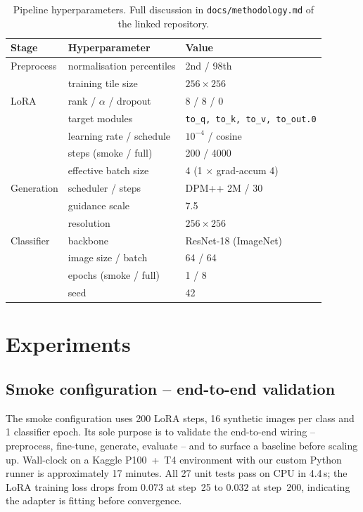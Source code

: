 \documentclass[12pt,a4paper]{article}
\begin{document}
\begin{table}[t]
\centering
\small
\begin{tabular}{lll}
\toprule
\textbf{Stage} & \textbf{Hyperparameter} & \textbf{Value} \\
\midrule
Preprocess     & normalisation percentiles      & 2nd / 98th \\
               & training tile size             & $256\times256$ \\
LoRA           & rank / $\alpha$ / dropout      & 8 / 8 / 0 \\
               & target modules                 & \texttt{to\_q,\ to\_k,\ to\_v,\ to\_out.0} \\
               & learning rate / schedule       & $10^{-4}$ / cosine \\
               & steps (smoke / full)           & 200 / 4000 \\
               & effective batch size           & 4 (1 $\times$ grad-accum 4) \\
Generation     & scheduler / steps              & DPM++ 2M / 30 \\
               & guidance scale                 & 7.5 \\
               & resolution                     & $256\times256$ \\
Classifier     & backbone                       & ResNet-18 (ImageNet) \\
               & image size / batch             & 64 / 64 \\
               & epochs (smoke / full)          & 1 / 8 \\
               & seed                           & 42 \\
\bottomrule
\end{tabular}
\caption{Pipeline hyperparameters. Full discussion in
\texttt{docs/methodology.md} of the linked repository.}
\label{tab:hyperparams}
\end{table}

\section{Experiments}
\label{sec:experiments}

\subsection{Smoke configuration -- end-to-end validation}
\label{sec:smoke}

The smoke configuration uses 200 LoRA steps, 16 synthetic images per
class and 1 classifier epoch. Its sole purpose is to validate the
end-to-end wiring -- preprocess, fine-tune, generate, evaluate -- and
to surface a baseline before scaling up. Wall-clock on a Kaggle
P100~+~T4 environment with our custom Python runner is approximately
17 minutes. All 27 unit tests pass on CPU in 4.4\,s; the LoRA training
loss drops from $0.073$ at step~25 to $0.032$ at step~200, indicating
the adapter is fitting before convergence.
\end{document}
